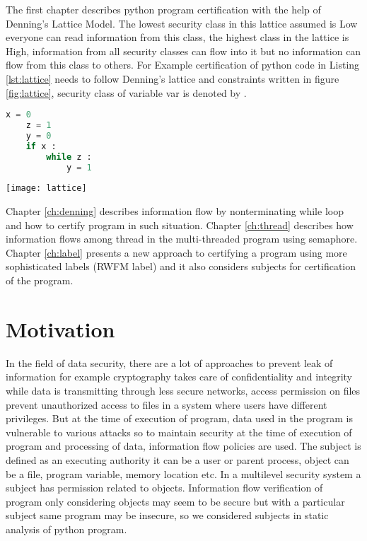 \begin{enumerate}
   The first chapter describes python program certification with the help of Denning's Lattice Model. The lowest security class in this lattice assumed is Low everyone can read information from this class, the highest class in the lattice is High, 
   information from all security classes can flow into it but no information can flow from this class to others.
For Example certification of python code in Listing \ref{lst:lattice} needs to follow Denning's lattice and constraints written in figure \ref{fig:lattice}, security class of variable var is denoted by .  
	\begin{lstlisting}[language=Python,caption={Python example}, label={lst:lattice}]
	x = 0
	z = 1
	y = 0
	if x :
		while z :
			y = 1\end{lstlisting}
	\begin{figure*}[h]
		\texttt{[image: lattice]}
		\centering
		\caption{Lattice of Listing \ref{lst:lattice}}
		\label{fig:lattice}
	\end{figure*}
    Chapter \ref{ch:denning} describes information flow by nonterminating while loop and how to certify program in such situation.
    Chapter \ref{ch:thread} describes how information flows among thread in the multi-threaded program using semaphore.
    Chapter \ref{ch:label} presents a new approach to certifying a program using more sophisticated labels (RWFM label)
    and it also considers subjects for certification of the program.	
\end{enumerate}     

\section{Motivation}
In the field of data security, there are a lot of approaches to prevent leak of information for example cryptography takes care of confidentiality and integrity while data is transmitting through less secure networks, access permission on files prevent unauthorized access to files in a system where users have different privileges. But at the time of execution of program, data used in the program is vulnerable to various attacks so to maintain security at the time of execution of program and processing of data, information flow policies are used. The subject is defined as an executing authority it can be a user or parent process, object can be a file, program variable, memory location etc. In a multilevel security system a subject has permission related to objects. Information flow verification of program only considering objects may seem to be secure but with a particular subject same program may be insecure, so we considered subjects in static analysis of python program.   

